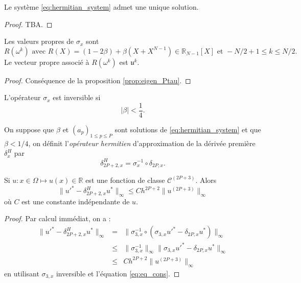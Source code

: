 \begin{proposition}
Le système \eqref{eq:hermitian_system} admet une unique solution.
\end{proposition}

\begin{proof}
TBA.
\end{proof}

\begin{proposition}
Les valeurs propres de $\sigma_x$ sont
\begin{equation}
R(\omega^k) \text{ avec } R(X) = (1-2 \beta) + \beta(X+X^{N-1}) \in \mathbb{R}_{N-1}[X] \text{ et } -N/2+1 \leq k \leq N/2.
\end{equation}
Le vecteur propre associé à $R(\omega^k)$ est $\mathfrak{u}^k$.
\end{proposition}

\begin{proof}
Conséquence de la proposition \ref{prop:eigen_Ptau}.
\end{proof}

\begin{corollaire}
L'opérateur $\sigma_x$ est inversible si
\begin{equation}
| \beta | < \dfrac{1}{4}.
\end{equation}
\end{corollaire}

\begin{definition}
On suppose que $\beta$ et $(a_p)_{1 \leq p \leq P}$ sont solutions de \eqref{eq:hermitian_system} et que $\beta < 1/4$, on définit l'\textit{opérateur hermitien} d'approximation de la dérivée première $\delta_x^H$ par 
\begin{equation}
\delta_{2P+2,x}^H = \sigma_x^{-1} \circ \delta_{2P,x}.
\end{equation}
\end{definition}

\begin{theoreme}
Si $u : x \in \Omega \mapsto u(x) \in \mathbb{R}$ est une fonction de classe $\mathcal{C}^{(2P+3)}$.
Alors 
\begin{equation}
\| u'^* - \delta_{2P+2,x}^H u^* \|_{\infty} \leq C h^{2P+2} \| u^{(2P+3)} \|_{\infty}
\end{equation}
où $C$ est une constante indépendante de $u$.
\label{th:consistence_herm2}
\end{theoreme}

\begin{proof}
Par calcul immédiat, on a :
\begin{equation}
\begin{array}{rcl}
\|  u'^* - \delta_{2P+2,x}^H u^* \|_{\infty} &=& \| \sigma_{3,x}^{-1} \circ \left( \sigma_{3,x} u'^*  - \delta_{2P,x}u^*\right) \|_{\infty}\\
                                      &\leq& \| \sigma_{3,x}^{-1} \|_{\infty} \| \sigma_{3,x} u'^*  - \delta_{2P,x}u^*\|_{\infty}\\
                                      &\leq& C h^{2P+2}  \| u^{(2P+3)} \|_{\infty}
\end{array}
\end{equation}
en utilisant $\sigma_{3,x}$ inversible et l'équation \eqref{eq:eq_cons}.
\end{proof}


